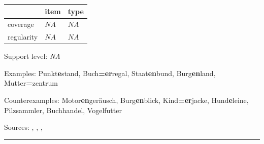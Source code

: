 \vspace{-0.25em}

\begin{table}[!ht]
\begin{center}
\setlength{\extrarowheight}{1pt}
\begin{tabularx}{\columnwidth}{|X|X|X|}
\hline
 & item & type \\
\hline
 coverage & $NA$ & $NA$ \\
\hline
 regularity & $NA$ & $NA$ \\
\hline
\end{tabularx}
\end{center}
\end{table}

\vspace{-1.35em}

\noindent
Support level: \textit{NA}

\vspace{0.3em}

\noindent
Examples: Punkt\textbf{e}stand, Buch\textbf{=er}regal, Staat\textbf{en}bund, Burg\textbf{en}land, Mutter\textbf{=}zentrum

\noindent
Counterexamples: Motor\textbf{en}geräusch, Burg\textbf{en}blick, Kind\textbf{=er}jacke, Hund\textbf{e}leine, Pilz{\zeroLinker}sammler, Buch{\zeroLinker}handel, Vogel{\zeroLinker}futter

\vspace{0.3em}

\noindent
Sources: \citet[3]{krott_etal_2007}, \citet[230, 231]{schaefer_2018}, \citet[20]{schluecker_2023}, \citet[173]{wegener_2005}

\vspace{0.35em}
\hrule




